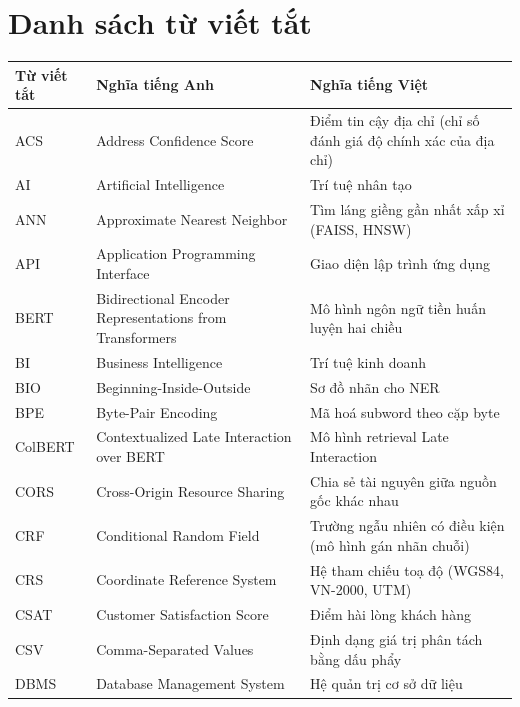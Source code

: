 \chapter*{Danh sách từ viết tắt}

\begin{longtable}{p{2.4cm} p{5.4cm} p{6.6cm}}
\toprule
\textbf{Từ viết tắt} & \textbf{Nghĩa tiếng Anh} & \textbf{Nghĩa tiếng Việt} \\
\midrule
\endhead

ACS         & Address Confidence Score              & Điểm tin cậy địa chỉ (chỉ số đánh giá độ chính xác của địa chỉ) \\
AI          & Artificial Intelligence               & Trí tuệ nhân tạo \\
ANN         & Approximate Nearest Neighbor          & Tìm láng giềng gần nhất xấp xỉ (FAISS, HNSW) \\
API         & Application Programming Interface     & Giao diện lập trình ứng dụng \\
BERT        & Bidirectional Encoder Representations from Transformers & Mô hình ngôn ngữ tiền huấn luyện hai chiều \\
BI          & Business Intelligence                  & Trí tuệ kinh doanh \\
BIO         & Beginning-Inside-Outside               & Sơ đồ nhãn cho NER \\
BPE         & Byte-Pair Encoding                     & Mã hoá subword theo cặp byte \\
ColBERT     & Contextualized Late Interaction over BERT & Mô hình retrieval Late Interaction \\
CORS        & Cross-Origin Resource Sharing          & Chia sẻ tài nguyên giữa nguồn gốc khác nhau \\
CRF         & Conditional Random Field               & Trường ngẫu nhiên có điều kiện (mô hình gán nhãn chuỗi) \\
CRS         & Coordinate Reference System            & Hệ tham chiếu toạ độ (WGS84, VN-2000, UTM) \\
CSAT        & Customer Satisfaction Score            & Điểm hài lòng khách hàng \\
CSV         & Comma-Separated Values                 & Định dạng giá trị phân tách bằng dấu phẩy \\
DBMS        & Database Management System             & Hệ quản trị cơ sở dữ liệu \\

\end{longtable}
